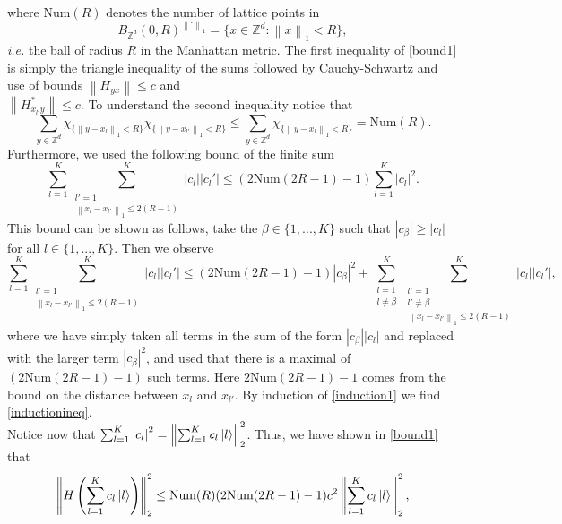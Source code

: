 \documentclass[a4paper,11pt]{article}
\newcommand{\norm}[1]{\left\lVert #1 \right\rVert}
\newcommand{\abs}[1]{\left\lvert #1 \right\rvert}
\newcommand{\Z}{\mathbb{Z}}
\numberwithin{equation}{section}
\begin{document}
 	 where $ \text{Num}(R) $ denotes the number of lattice points in \begin{equation}
 	 B_{\Z^d}(0,R)^{\norm{\cdot}_1}=\{x\in\Z^d : \norm{x}_1<R \},
 	 \end{equation} \emph{i.e.} the ball of radius $ R $ in the Manhattan metric. The first inequality of \eqref{bound1} is simply the triangle inequality of the sums followed by Cauchy-Schwartz and use of bounds $ \norm{H_{yx}}\leq c $ and\\ $ \norm{H^*_{x_{l'}y}}\leq c $. To understand the second inequality notice that\begin{equation}
 	 \sum_{y\in\Z^d}\chi_{\{\norm{y-x_l}_1<R\}}\chi_{\{\norm{y-x_{l'}}_1<R\}}\leq\sum_{y\in\Z^d}\chi_{\{\norm{y-x_l}_1<R\}}=\text{Num}(R).
 	 \end{equation} Furthermore, we used the following bound of the finite sum \begin{equation}
 	 \sum_{l=1}^{K}\sum_{\substack{l'=1\\\norm{x_l-x_{l'}}_1\leq2(R-1)}}^{K}\abs{c_l}\abs{c_l'}\leq (2\text{Num}(2R-1)-1)\sum_{l=1}^{K}\abs{c_l}^2. \label{inductionineq}
 	 \end{equation}
 	 This bound can be shown as follows, take the $ \beta\in \{1,...,K\} $ such that $ |c_\beta|\geq|c_l| $ for all $ l\in \{1,...,K\} $. Then we observe\begin{equation}
 	  \sum_{l=1}^{K}\sum_{\substack{l'=1\\\norm{x_l-x_{l'}}_1\leq2(R-1)}}^{K}\abs{c_l}\abs{c_l'}\leq (2\text{Num}(2R-1)-1)\abs{c_\beta}^2+ \sum_{\substack{l=1\\ l\neq\beta}}^{K}\sum_{\substack{l'=1\\l'\neq\beta\\\norm{x_l-x_{l'}}_1\leq2(R-1)}}^{K}\abs{c_l}\abs{c_l'},\label{induction1}
 	 \end{equation}
 	 where we have simply taken all terms in the sum of the form $ |c_\beta||c_l| $ and replaced with the larger term $ |c_\beta|^2 $, and used that there is a maximal of $ (2\text{Num}(2R-1)-1) $ such terms. Here $2\text{Num}(2R-1)-1$ comes from the bound on the distance between $ x_l $ and $ x_{l'} $. By induction of \eqref{induction1} we find \eqref{inductionineq}.\\
 	 Notice now that $ \sum_{l=1}^{K}\abs{c_l}^2=\norm{\sum_{l=1}^{K}c_l\ket{l}}_2^2 $. Thus, we have shown in \eqref{bound1} that \begin{equation}
 	 \norm{H\left(\sum_{l=1}^{K}c_l\ket{l}\right)}_2^2\leq \text{Num}(R)(2\text{Num}(2R-1)-1)c^2\norm{\sum_{l=1}^{K}c_l\ket{l}}_2^2,
 	 \end{equation} 
\end{document}
